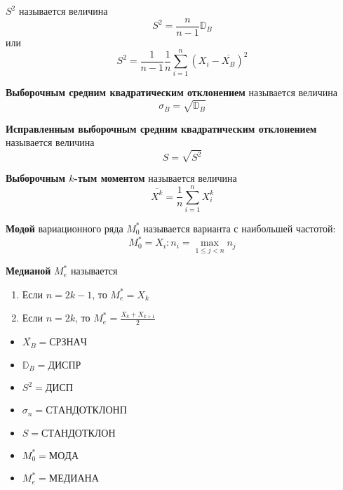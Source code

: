 \begin{definition}
    \? \(S^2\) называется величина
    \[S^2 = \frac{n}{n - 1} \mathbb{D}_B\]
    или
    \[S^2 = \frac{1}{n - 1} \frac{1}{n} \sum_{i=1}^{n} (X_i - \overline{X_B})^2\]
\end{definition}

\begin{definition}
    \textbf{Выборочным средним квадратическим отклонением} называется величина
    \[\sigma_B = \sqrt{\mathbb{D}_B}\]
\end{definition}

\begin{definition}
    \textbf{Исправленным выборочным средним квадратическим отклонением} называется величина
    \[S = \sqrt{S^2}\]
\end{definition}

\begin{definition}
    \textbf{Выборочным \(k\)-тым моментом} называется величина
    \[\overline{X^k} = \frac{1}{n}\sum_{i=1}^{n} X_i^k\]
\end{definition}

\begin{definition}
    \textbf{Модой} вариационного ряда \(M_0^*\) называется варианта с наибольшей частотой:
    \[M_0^* = X_i : n_i = \max_{1 \leq j < n} n_j\]
\end{definition}

\begin{definition}
    \textbf{Медианой} \(M_e^*\) называется \?
    \begin{enumerate}
        \item Если \(n = 2k - 1\), то \(M_e^* = X_k\)
        \item Если \(n = 2k\), то \(M_e^* = \frac{X_k + X_{k + 1}}{2}\)
    \end{enumerate}
\end{definition}

\begin{remark}\itemfix
    \begin{itemize}
        \item \(\overline{X_B} = \mathrm{СРЗНАЧ}\)
        \item \(\mathbb{D}_B = \mathrm{ДИСПР}\)
        \item \(S^2 = \mathrm{ДИСП}\)
        \item \(\sigma_n = \mathrm{СТАНДОТКЛОНП}\)
        \item \(S = \mathrm{СТАНДОТКЛОН}\)
        \item \(M_0^* = \mathrm{МОДА}\)
        \item \(M_e^* = \mathrm{МЕДИАНА}\)
    \end{itemize}
\end{remark}

